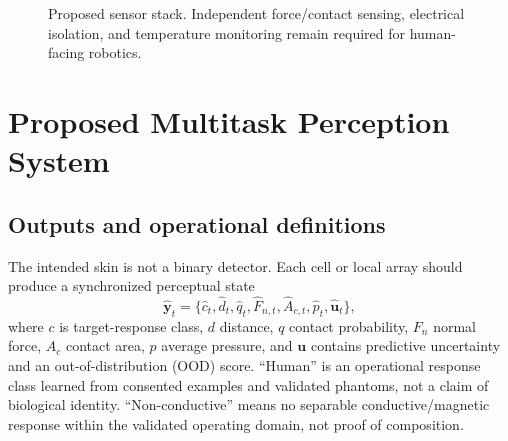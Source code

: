 \documentclass[10pt]{article}
\begin{document}
\begin{figure}[t]
\centering
{}
\caption{Proposed sensor stack. Independent force/contact sensing, electrical isolation, and temperature monitoring remain required for human-facing robotics.}
\label{fig:stack}
\end{figure}

\section{Proposed Multitask Perception System}
\label{sec:ai}
\subsection{Outputs and operational definitions}
The intended skin is not a binary detector. Each cell or local array should produce a synchronized perceptual state
\begin{equation}
\hat{\mathbf{y}}_t=\{\hat c_t,\hat d_t,\hat q_t,\hat F_{n,t},\hat A_{c,t},\hat p_t,\hat{\mathbf{u}}_t\},
\end{equation}
where $c$ is target-response class, $d$ distance, $q$ contact probability, $F_n$ normal force, $A_c$ contact area, $p$ average pressure, and $\mathbf{u}$ contains predictive uncertainty and an out-of-distribution (OOD) score. ``Human'' is an operational response class learned from consented examples and validated phantoms, not a claim of biological identity. ``Non-conductive'' means no separable conductive/magnetic response within the validated operating domain, not proof of composition.
\end{document}
